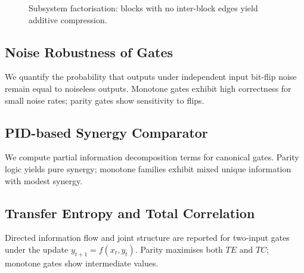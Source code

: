 \documentclass[11pt]{article}
\begin{document}
\begin{figure}[h]
\centering
{}
\caption{Subsystem factorisation: blocks with no inter-block edges yield additive compression.}
\end{figure}
\subsection{Noise Robustness of Gates}
We quantify the probability that outputs under independent input bit-flip noise remain equal to noiseless outputs. Monotone gates exhibit high correctness for small noise rates; parity gates show sensitivity to flips.
\begin{center}
\end{center}

\subsection{PID-based Synergy Comparator}
We compute partial information decomposition terms for canonical gates. Parity logic yields pure synergy; monotone families exhibit mixed unique information with modest synergy.
\begin{center}
\end{center}
\begin{center}
\end{center}

\subsection{Transfer Entropy and Total Correlation}
Directed information flow and joint structure are reported for two-input gates under the update $y_{t+1}=f(x_t,y_t)$. Parity maximises both $TE$ and $TC$; monotone gates show intermediate values.
\begin{center}
\end{center}
\begin{center}
\end{center}
\end{document}
